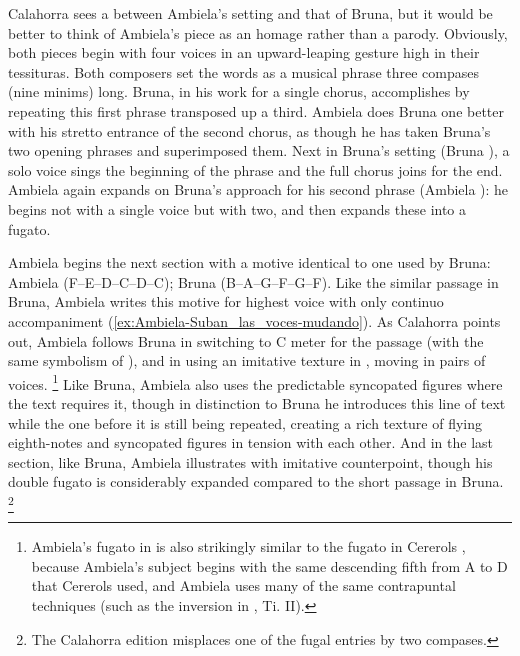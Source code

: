Calahorra sees a  between Ambiela's setting and that of Bruna, but it would be better to think of Ambiela's piece as an homage rather than a parody.
	\autocite[18]{Calahorra:Suban}
Obviously, both pieces begin with four voices in an upward-leaping gesture high in their tessituras.
Both composers set the words  as a musical phrase three compases (nine minims) long.
Bruna, in his work for a single chorus, accomplishes  by repeating this first phrase transposed up a third.
Ambiela does Bruna one better with his stretto entrance of the second chorus, as though he has taken Bruna's two opening phrases and superimposed them.
Next in Bruna's setting (Bruna ), a solo voice sings the beginning of the phrase and the full chorus joins for the end. 
Ambiela again expands on Bruna's approach for his second phrase (Ambiela ): he begins not with a single voice but with two, and then expands these into a fugato.

Ambiela begins the next section with a motive identical to one used by Bruna: Ambiela  (F--E--D--C\sh--D--C\sh); Bruna  (B\fl--A--G--F\sh--G--F\sh).
Like the similar passage in Bruna, Ambiela writes this motive for highest voice with only continuo accompaniment (\cref{ex:Ambiela-Suban_las_voces-mudando}).
As Calahorra points out, Ambiela follows Bruna in switching to C meter for the  passage (with the same symbolism of ), and in using an imitative texture in , moving  in pairs of voices.%
	\footnote{%
Ambiela's fugato in  is also strikingly similar to the fugato in Cererols , because Ambiela's subject begins with the same descending fifth from A to D that Cererols used, and Ambiela uses many of the same contrapuntal techniques (such as the inversion in , Ti. II).
	}
Like Bruna, Ambiela also uses the predictable syncopated figures where the text requires it, though in distinction to Bruna he introduces this line of text while the one before it is still being repeated, creating a rich texture of flying eighth-notes and syncopated figures in tension with each other.
And in the last section, like Bruna, Ambiela illustrates  with imitative counterpoint, though his double fugato is considerably expanded compared to the short passage in Bruna.%
	\footnote{%
	The Calahorra edition misplaces one of the fugal entries by two compases.
	}

